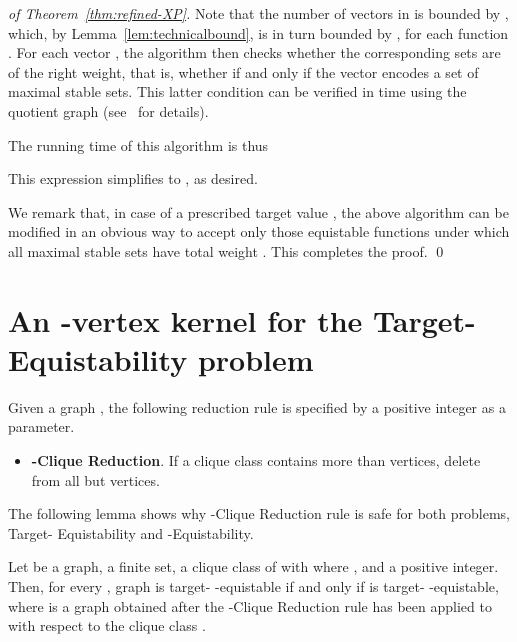 \documentclass{llncs}
\begin{document}
\begin{proof}[of Theorem~\ref{thm:refined-XP}]
Note that the number of vectors in  is bounded by , which, by Lemma~\ref{lem:technicalbound},
is in turn bounded by , for each function . For each vector , the algorithm then checks whether the corresponding sets are of the right weight, that is, whether  if  and only if the vector encodes a set of maximal stable sets. This latter condition can be verified in time  using the quotient graph  (see~\cite{MR3040147} for details).

\begin{sloppypar}
The running time of this algorithm is thus

This expression simplifies to , as desired.
\end{sloppypar}

We remark that, in case of a prescribed target value , the above algorithm can be modified in an obvious way to accept only those equistable functions under which all maximal stable sets have total weight . This completes the proof.
\qed \end{proof}


\section{An -vertex kernel for the {\sc Target- Equistability} problem}\label{sec:t-equi}

Given a graph , the following reduction rule is specified by a positive integer  as a parameter.

\begin{itemize}
  \item[] {\bf -Clique Reduction}. If a clique class  contains more than  vertices, delete from  all but  vertices.
\end{itemize}
The following lemma shows why -Clique Reduction rule is safe for both problems, {\sc Target- Equistability} and {\sc -Equistability}.

\begin{lemma}\label{lem:clique-reduction}
Let  be a graph,  a finite set,  a clique class of  with  where , and  a positive integer.
Then, for every , graph  is target- -equistable if and only if  is target- -equistable, where  is a graph obtained after the -Clique Reduction rule has been applied to  with respect to the clique class .
\end{lemma}
\end{document}
